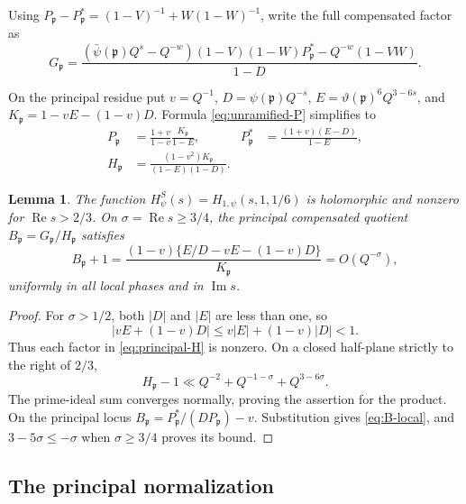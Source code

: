 \documentclass[11pt,a4paper]{article}
\numberwithin{equation}{section}
\newtheorem{lemma}[theorem]{Lemma}
\theoremstyle{definition}
\theoremstyle{remark}
\newcommand{\Rea}{\operatorname{Re}}
\newcommand{\Ima}{\operatorname{Im}}
\begin{document}
Using $P_{\mathfrak p}-P_{\mathfrak p}^*=(1-V)^{-1}+W(1-W)^{-1}$,
write the full compensated factor as
\begin{equation}\label{eq:quotient-free}
 G_{\mathfrak p}=
 \frac{(\bar\psi(\mathfrak p)Q^s-Q^{-w})(1-V)(1-W)P_{\mathfrak p}^*
                 -Q^{-w}(1-VW)}{1-D}.
\end{equation}

On the principal residue put $v=Q^{-1}$, $D=\psi(\mathfrak p)Q^{-s}$,
$E=\vartheta(\mathfrak p)^6Q^{3-6s}$, and
$K_{\mathfrak p}=1-vE-(1-v)D$.  Formula \eqref{eq:unramified-P} simplifies to
\begin{align}
 P_{\mathfrak p}&=\frac{1+v}{1-v}\frac{K_{\mathfrak p}}{1-E},&
 P_{\mathfrak p}^*&=\frac{(1+v)(E-D)}{1-E},\label{eq:principal-P}\\
 H_{\mathfrak p}&=\frac{(1-v^2)K_{\mathfrak p}}{(1-E)(1-D)}.
 \label{eq:principal-H}
\end{align}

\begin{lemma}\label{lem:principal-nonzero}
The function $H_\psi^S(s)=H_{1,\psi}(s,1,1/6)$ is holomorphic and nonzero
for $\Rea s>2/3$.  On $\sigma=\Rea s\geq3/4$, the principal compensated
quotient $B_{\mathfrak p}=G_{\mathfrak p}/H_{\mathfrak p}$ satisfies
\begin{equation}\label{eq:B-local}
 B_{\mathfrak p}+1=
 \frac{(1-v)\{E/D-vE-(1-v)D\}}{K_{\mathfrak p}}
       =O(Q^{-\sigma}),
\end{equation}
uniformly in all local phases and in $\Ima s$.
\end{lemma}
\begin{proof}
For $\sigma>1/2$, both $|D|$ and $|E|$ are less than one, so
\[
 |vE+(1-v)D|\leq v|E|+(1-v)|D|<1.
\]
Thus each factor in \eqref{eq:principal-H} is nonzero.
On a closed half-plane strictly to the right of $2/3$,
\[
 H_{\mathfrak p}-1
      \ll Q^{-2}+Q^{-1-\sigma}+Q^{3-6\sigma}.
\]
The prime-ideal sum converges normally, proving the assertion for the
product.  On the principal locus
$B_{\mathfrak p}=P_{\mathfrak p}^*/(DP_{\mathfrak p})-v$.
Substitution gives \eqref{eq:B-local}, and
$3-5\sigma\leq-\sigma$ when $\sigma\geq3/4$ proves its bound.
\end{proof}

\subsection{The principal normalization}
\end{document}
